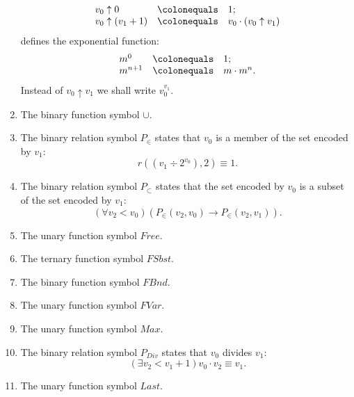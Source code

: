 \begin{enumerate}[1.]
\[\begin{array}{lll}
v_0 \uparrow 0 & \colonequals & 1;\cr
v_0 \uparrow (v_1 + 1) & \colonequals & v_0 \cdot (v_0 \uparrow v_1)
\end{array}
\]
defines the exponential function:
\[
\begin{array}{lll}
m^0 & \colonequals & 1;\cr
m^{n + 1} & \colonequals & m \cdot m^n.
\end{array}
\]
Instead of $v_0 \uparrow v_1$ we shall write $v_0^{v_1}$.
%
\item The binary function symbol $\cup$.
%
\item The binary relation symbol $P_\in$ states that $v_0$ is a member of the set encoded by $v_1$:
\[
r((v_1 \div 2^{v_0}), 2) \equiv 1.
\]
%
\item The binary relation symbol $P_\subset$ states that the set encoded by $v_0$ is a subset of the set encoded by $v_1$:
\[
(\forall v_2 < v_0)(P_\in (v_2, v_0) \rightarrow P_\in (v_2, v_1)).
\]
%
\item The unary function symbol $Free$.
%
\item The ternary function symbol $FSbst$.
%
\item The binary function symbol $FBnd$.
%
\item The unary function symbol $FVar$.
%
\item The unary function symbol $Max$.
%
\item The binary relation symbol $P_{Div}$ states that $v_0$ divides $v_1$:
\[
(\exists v_2 < v_1 + 1)v_0 \cdot v_2 \equiv v_1.
\]
%
\item The unary function symbol $Last$.
%
\end{enumerate}
\ \\
